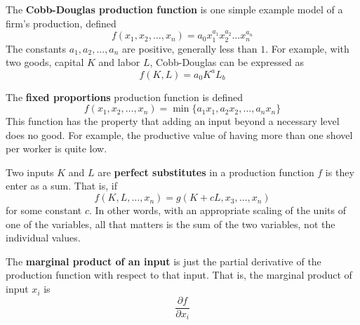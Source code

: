 \documentclass{article}
\begin{document}
    \begin{definition}
      \label{def:cobb-douglas-production-function}
      The \textbf{Cobb-Douglas production function} is one simple example model of a firm's production, defined 
      \begin{equation}
        f(x_1, x_2, \ldots, x_n) = a_0 x_1^{a_1} x_2^{a_2} \ldots x_n^{a_n}
      \end{equation}
      The constants $a_1, a_2, \ldots, a_n$ are positive, generally less than $1$. For example, with two goods, capital $K$ and labor $L$, Cobb-Douglas can be expressed as 
      \begin{equation}
        f(K, L) = a_0 K^a L_b
      \end{equation}
    \end{definition}

    \begin{definition}
      \label{def:fixed-proportions-production-function}
      The \textbf{fixed proportions} production function is defined
      \begin{equation}
        f(x_1, x_2, \ldots, x_n) = \min \{a_1 x_1, a_2 x_2, \ldots, a_n x_n\}
      \end{equation}
      This function has the property that adding an input beyond a necessary level does no good. For example, the productive value of having more than one shovel per worker is quite low. 
    \end{definition}

    \begin{definition}
      \label{def:inputs-as-perfect-substitutes}
      Two inputs $K$ and $L$ are \textbf{perfect substitutes} in a production function $f$ is they enter as a sum. That is, if 
      \begin{equation}
        f(K, L, \ldots, x_n) = g(K + c L, x_3, \ldots, x_n)
      \end{equation}
      for some constant $c$. In other words, with an appropriate scaling of the units of one of the variables, all that matters is the sum of the two variables, not the individual values. 
    \end{definition}

    \begin{definition}
      \label{def:marginal-product}
      The \textbf{marginal product of an input} is just the partial derivative of the production function with respect to that input. That is, the marginal product of input $x_i$ is
      \begin{equation}
        \frac{\partial f}{\partial x_i}
      \end{equation}
    \end{definition}
\end{document}
